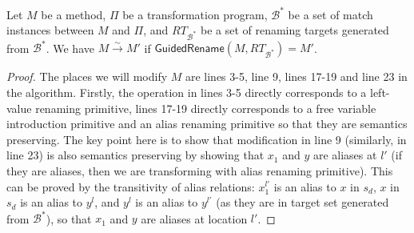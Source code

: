 \documentclass[letterpaper, USenglish]{lipics-v2016}
\theoremstyle{plain}
\begin{document}
\begin{prop}
  Let $M$ be a method, $\Pi$ be a transformation program,
  $\mathcal{B}^*$ be a set of match instances between $M$ and $\Pi$, and
  $RT_{\mathcal{B}^*}$ be a set of renaming targets generated from $\mathcal{B}^*$. We have
  $M\xrightarrow{\sim} M'$ if $\mathsf{GuidedRename}(M,
\mathit{RT}_{\mathcal{B}^*})=M'$.
\end{prop}
\begin{proof} The places we will modify $M$ are lines 3-5, line 9, lines 17-19 and line 23 in the algorithm. Firstly, the operation in lines 3-5 directly corresponds to a left-value renaming primitive, lines 17-19 directly corresponds to a free variable introduction primitive and an alias renaming primitive so that they are semantics preserving. The key point here is to show that modification in line 9 (similarly, in line 23) is also semantics preserving by showing that $x_1$ and $y$ are aliases at $l'$ (if they are aliases, then we are transforming with alias renaming primitive). This can be proved by the transitivity of alias relations: $x_1^{l'}$ is an alias to $x$ in $s_d$, $x$ in $s_d$ is an alias to $y^l$, and $y^l$ is an alias to $y^{l'}$ (as they are in target set generated from $\mathcal{B}^*$), so that $x_1$ and $y$ are aliases at location $l'$.
\end{proof}
\end{document}
